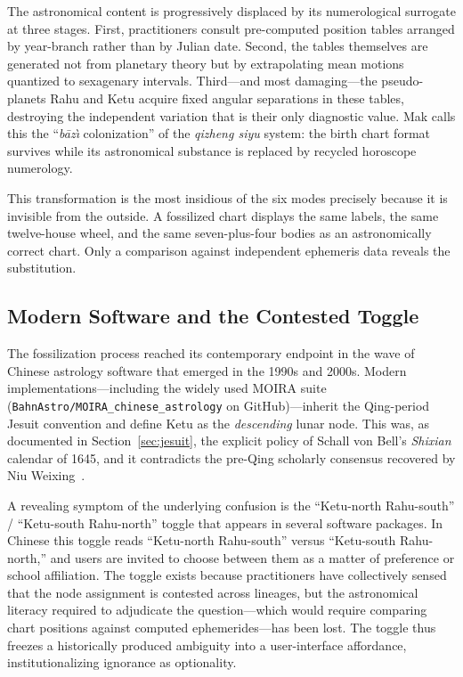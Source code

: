 \documentclass[10pt,a4paper]{article}
\begin{document}
The astronomical content is progressively displaced by its numerological
surrogate at three stages.  First, practitioners consult pre-computed position
tables arranged by year-branch rather than by Julian date.  Second, the tables
themselves are generated not from planetary theory but by extrapolating mean
motions quantized to sexagenary intervals.  Third---and most damaging---the
pseudo-planets Rahu and Ketu acquire fixed angular
separations in these tables, destroying the independent variation that is their
only diagnostic value.  Mak calls this the ``\textit{b\={a}z\`{\i}} colonization'' of the
\textit{qizheng siyu} system: the birth chart format survives while its astronomical
substance is replaced by recycled horoscope numerology.

This transformation is the most insidious of the six modes precisely because it
is invisible from the outside.  A fossilized chart displays the same labels, the
same twelve-house wheel, and the same seven-plus-four bodies as an
astronomically correct chart.  Only a comparison against independent ephemeris
data reveals the substitution.

\subsection*{Modern Software and the Contested Toggle}

The fossilization process reached its contemporary endpoint in the wave of
Chinese astrology software that emerged in the 1990s and 2000s.  Modern
implementations---including the widely used
\textsc{MOIRA} suite (\texttt{BahnAstro/MOIRA\_chinese\_astrology} on
GitHub)---inherit the Qing-period Jesuit convention and define Ketu as the
\emph{descending} lunar node.  This was, as documented in Section~\ref{sec:jesuit},
the explicit policy of Schall von Bell's \textit{Shixian} calendar of 1645, and
it contradicts the pre-Qing scholarly consensus recovered by Niu
Weixing~\cite{niu1995ketu}.

A revealing symptom of the underlying confusion is the
``Ketu-north Rahu-south'' / ``Ketu-south Rahu-north'' toggle that appears in several software packages.
In Chinese this toggle reads ``Ketu-north Rahu-south'' versus ``Ketu-south
Rahu-north,'' and users are invited to choose between them as a matter of
preference or school affiliation.  The toggle exists because practitioners have
collectively sensed that the node assignment is contested across lineages, but
the astronomical literacy required to adjudicate the question---which would
require comparing chart positions against computed ephemerides---has been lost.
The toggle thus freezes a historically produced ambiguity into a user-interface
affordance, institutionalizing ignorance as optionality.
\end{document}
